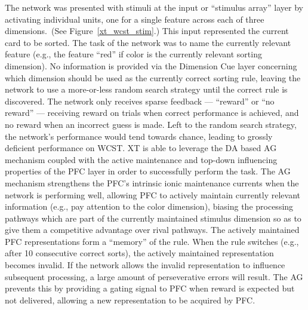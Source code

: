 The network was presented with stimuli at the input or ``stimulus array'' layer by activating individual units, one for a single feature across each of three dimensions.~(See Figure~\ref{xt_wcst_stim}.)  This input represented the current card to be sorted.  The task of the network was to name the currently relevant feature (e.g., the feature ``red'' if color is the currently relevant sorting dimension).  No information is provided via the Dimension Cue layer concerning which dimension should be used as the currently correct sorting rule, leaving the network to use a more-or-less random search strategy until the correct rule is discovered.  The network only receives sparse feedback --- ``reward'' or ``no reward'' --- receiving reward on trials when correct performance is achieved, and no reward when an incorrect guess is made.  Left to the random search strategy, the network's performance would tend towards chance, leading to grossly deficient performance on WCST.  XT is able to leverage the DA based AG mechanism coupled with the active maintenance and top-down influencing properties of the PFC layer in order to successfully perform the task.  The AG mechanism strengthens the PFC's intrinsic ionic maintenance currents when the network is performing well, allowing PFC to actively maintain currently relevant information (e.g., pay attention to the color dimension), biasing the processing pathways which are part of the currently maintained stimulus dimension so as to give them a competitive advantage over rival pathways.  The actively maintained PFC representations form a ``memory'' of the rule.  When the rule switches (e.g., after 10 consecutive correct sorts), the actively maintained representation becomes invalid.  If the network allows the invalid representation to influence subsequent processing, a large amount of perseverative errors will result.  The AG prevents this by providing a gating signal to PFC when reward is expected but not delivered, allowing a new representation to be acquired by PFC.



%
%
%


